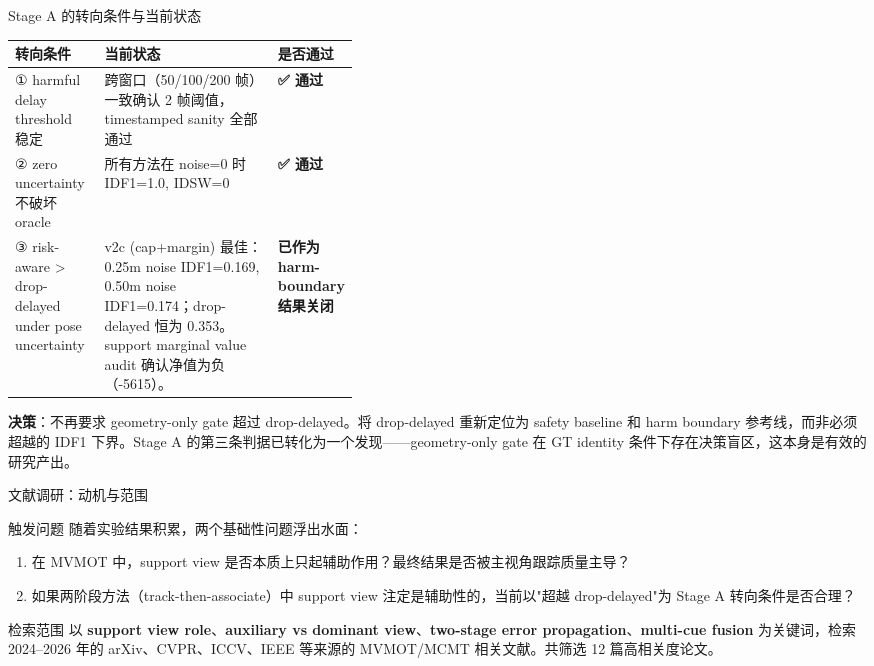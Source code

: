 \documentclass[aspectratio=169,xcolor=dvipsnames]{beamer}
\newcommand{\metric}[1]{\textbf{#1}}
\newcommand{\term}[1]{\textbf{#1}}
\begin{document}
\begin{frame}{Stage A 的转向条件与当前状态}
\scriptsize
\begin{tabularx}{\linewidth}{p{0.26\linewidth} X p{0.14\linewidth}}
\toprule
转向条件 & 当前状态 & 是否通过 \\
\midrule
① harmful delay threshold 稳定 & 跨窗口（50/100/200 帧）一致确认 2 帧阈值，timestamped sanity 全部通过 & \metric{✅ 通过} \\
\addlinespace
② zero uncertainty 不破坏 oracle & 所有方法在 noise=0 时 IDF1=1.0, IDSW=0 & \metric{✅ 通过} \\
\addlinespace
③ risk-aware > drop-delayed
  under pose uncertainty &
v2c (cap+margin) 最佳：0.25m noise IDF1=0.169, 0.50m noise IDF1=0.174；drop-delayed 恒为 0.353。
support marginal value audit 确认净值为负（-5615）。 &
\metric{已作为 harm-boundary 结果关闭} \\
\bottomrule
\end{tabularx}

\vspace{2mm}
{\small \textbf{决策}：不再要求 geometry-only gate 超过 drop-delayed。将 drop-delayed 重新定位为 safety baseline 和 harm boundary 参考线，而非必须超越的 IDF1 下界。Stage A 的第三条判据已转化为一个发现——geometry-only gate 在 GT identity 条件下存在决策盲区，这本身是有效的研究产出。}
\end{frame}


\begin{frame}{文献调研：动机与范围}
\small
\begin{block}{触发问题}
随着实验结果积累，两个基础性问题浮出水面：
\begin{enumerate}
  \item 在 MVMOT 中，support view 是否本质上只起辅助作用？最终结果是否被主视角跟踪质量主导？
  \item 如果两阶段方法（track-then-associate）中 support view 注定是辅助性的，当前以"超越 drop-delayed"为 Stage A 转向条件是否合理？
\end{enumerate}
\end{block}

\begin{block}{检索范围}
以 \term{support view role}、\term{auxiliary vs dominant view}、\term{two-stage error propagation}、\term{multi-cue fusion} 为关键词，检索 2024--2026 年的 arXiv、CVPR、ICCV、IEEE 等来源的 MVMOT/MCMT 相关文献。共筛选 12 篇高相关度论文。
\end{block}
\end{frame}
\end{document}
